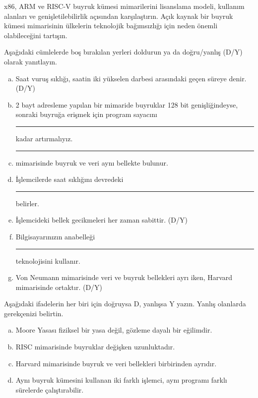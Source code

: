 \begin{alistirma}[\zor]
x86, ARM ve RISC-V buyruk kümesi mimarilerini lisanslama modeli, kullanım alanları ve genişletilebilirlik açısından karşılaştırın. Açık kaynak bir buyruk kümesi mimarisinin ülkelerin teknolojik bağımsızlığı için neden önemli olabileceğini tartışın.
\end{alistirma}


\begin{alistirma}[\kolay]
Aşağıdaki cümlelerde boş bırakılan yerleri doldurun ya da doğru/yanlış (D/Y) olarak yanıtlayın.
\begin{enumerate}[(a)]
    \item Saat vuruş sıklığı, saatin iki yükselen darbesi arasındaki geçen süreye denir. (D/Y)
    \item 2 bayt adresleme yapılan bir mimaride buyruklar 128 bit genişliğindeyse, sonraki buyruğa erişmek için program sayacını \rule{2cm}{0.4pt} kadar artırmalıyız.
    \item \rule{3cm}{0.4pt} mimarisinde buyruk ve veri aynı bellekte bulunur.
    \item İşlemcilerde saat sıklığını devredeki \rule{3cm}{0.4pt} belirler.
    \item İşlemcideki bellek gecikmeleri her zaman sabittir. (D/Y)
    \item Bilgisayarınızın anabelleği \rule{2cm}{0.4pt} teknolojisini kullanır.
    \item Von Neumann mimarisinde veri ve buyruk bellekleri ayrı iken, Harvard mimarisinde ortaktır. (D/Y)
\end{enumerate}
\end{alistirma}

\begin{alistirma}[\orta]
Aşağıdaki ifadelerin her biri için doğruysa D, yanlışsa Y yazın. Yanlış olanlarda gerekçenizi belirtin.
\begin{enumerate}[(a)]
    \item Moore Yasası fiziksel bir yasa değil, gözleme dayalı bir eğilimdir.
    \item RISC mimarisinde buyruklar değişken uzunluktadır.
    \item Harvard mimarisinde buyruk ve veri bellekleri birbirinden ayrıdır.
    \item Aynı buyruk kümesini kullanan iki farklı işlemci, aynı programı farklı sürelerde çalıştırabilir.
\end{enumerate}
\end{alistirma}

